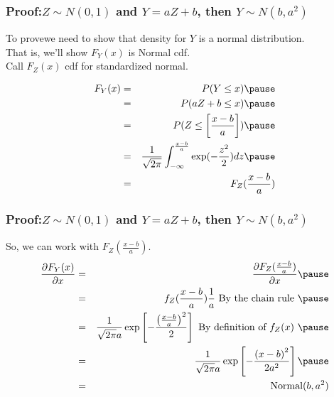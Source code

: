 \documentclass[handout]{beamer}
\numberwithin{equation}{section}
\begin{document}
\begin{frame}
\frametitle{Proof:$Z \sim N(0,1)$ and $Y = aZ + b$, then  $Y \sim N(b, a^2)$ } 
To prove\pause  we need to show that density for $Y$ is a normal distribution.  \pause  \\
That is, we'll show $F_{Y}(x)$ is Normal cdf.\pause   \\
Call $F_{Z}(x)$ cdf for standardized normal. \pause   

\begin{eqnarray}
F_{Y} (x) & = & P(Y \leq x) \nonumber  \pause  \\
& = & P(aZ + b \leq x) \nonumber  \pause  \\
& = & P(Z \leq \left[\frac{x - b}{a} \right] ) \nonumber  \pause  \\
& = & \frac{1}{\sqrt{2\pi} } \int_{-\infty}^{\frac{x-b}{a} } \exp( - \frac{z^2}{2} ) dz \nonumber \pause  \\
& = &F_{Z} (\frac{x - b}{a} )\nonumber 
 \end{eqnarray}
\end{frame}


\begin{frame}
\frametitle{Proof:$Z \sim N(0,1)$ and $Y = aZ + b$, then  $Y \sim N(b, a^2)$ } 

So, we can work with $F_{Z}(\frac{x - b}{a} )$.  \pause 
\begin{eqnarray}
\frac{\partial F_{Y}(x) }{\partial x} & =& \frac{\partial F_{Z} (\frac{x - b}{a} ) }{\partial x} \nonumber \pause \\
& = & f_{Z} (\frac{x - b}{a} ) \frac{1}{a}  \text{ By the chain rule } \pause \nonumber \\
& = & \frac{1}{\sqrt{2 \pi } a } \exp\left[-\frac{\left(\frac{x-b}{a} \right)^2}{2 }\right] \nonumber \text{ By definition of $f_{Z}(x)$ } \pause \\
& = & \frac{1}{\sqrt{2 \pi } a } \exp\left[-\frac{\left(x-b\right)^2}{2a^2 }\right] \nonumber  \pause \\
& = & \text{Normal} (b, a^2) \nonumber 
\end{eqnarray}

\end{frame}
\end{document}
